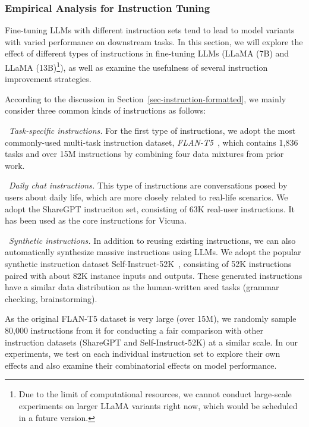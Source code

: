 \subsubsection{Empirical Analysis for Instruction Tuning} \label{instruction-results}

Fine-tuning LLMs with different instruction sets tend to  lead to model  variants with varied performance on downstream tasks.  In this section, we will explore the effect of different types of instructions in  fine-tuning LLMs (\ie LLaMA (7B) and LLaMA (13B)\footnote{Due to the limit of computational resources, we cannot conduct large-scale experiments on larger LLaMA variants right now, which would be scheduled in a future version.}), as well as examine the usefulness of several instruction improvement strategies.

 According to the discussion in  Section~\ref{sec-instruction-formatted}, we mainly consider three common kinds of instructions as follows: 

\textbullet~\emph{Task-specific instructions.} For the first type of   instructions, we adopt the most commonly-used multi-task  instruction dataset, \emph{FLAN-T5}~\cite{Chung-arxiv-2022-Scaling}, which contains 1,836 tasks and over 15M instructions by combining four data mixtures from prior work.

\textbullet~\emph{Daily chat instructions.} This type of instructions are conversations posed by  users about daily life, which are more closely related to real-life scenarios. We adopt the  ShareGPT instruciton set, consisting of 63K real-user instructions. It has been used as the core instructions for  Vicuna.

\textbullet~\emph{Synthetic instructions.} In addition to reusing existing instructions, we can also automatically synthesize massive instructions using LLMs. We adopt the popular synthetic instruction dataset Self-Instruct-52K~\cite{Wang-arXiv-2022-Self}, consisting of  52K instructions paired with about 82K instance inputs and outputs. These generated instructions have a similar data distribution as the human-written seed tasks (\eg grammar checking, brainstorming).

{As the original FLAN-T5 dataset is very large (\ie over 15M), we randomly sample 80,000 instructions from it for conducting a fair comparison with other instruction datasets (\ie ShareGPT and Self-Instruct-52K) at a similar scale.
In our experiments, we test on each individual instruction set to explore their own effects and also examine their combinatorial effects on model performance. 
}


